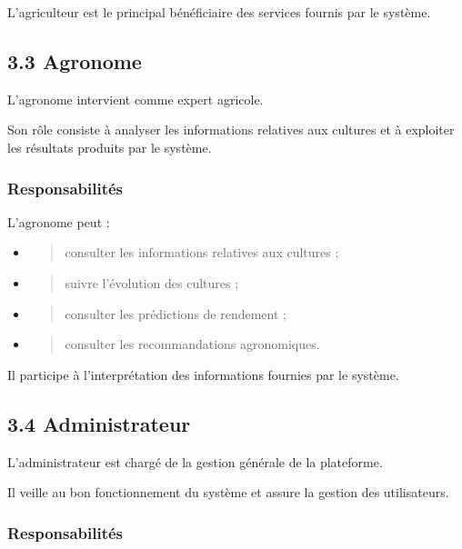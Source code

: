\documentclass[
]{article}
\begin{document}
L'agriculteur est le principal bénéficiaire des services fournis par le
système.

\hypertarget{agronome}{%
\subsection{3.3 Agronome}\label{agronome}}

L'agronome intervient comme expert agricole.

Son rôle consiste à analyser les informations relatives aux cultures et
à exploiter les résultats produits par le système.

\hypertarget{responsabilituxe9s-1}{%
\subsubsection{Responsabilités}\label{responsabilituxe9s-1}}

L'agronome peut :

\begin{itemize}
\item
  \begin{quote}
  consulter les informations relatives aux cultures ;
  \end{quote}
\item
  \begin{quote}
  suivre l'évolution des cultures ;
  \end{quote}
\item
  \begin{quote}
  consulter les prédictions de rendement ;
  \end{quote}
\item
  \begin{quote}
  consulter les recommandations agronomiques.
  \end{quote}
\end{itemize}

Il participe à l'interprétation des informations fournies par le
système.

\hypertarget{administrateur}{%
\subsection{3.4 Administrateur}\label{administrateur}}

L'administrateur est chargé de la gestion générale de la plateforme.

Il veille au bon fonctionnement du système et assure la gestion des
utilisateurs.

\hypertarget{responsabilituxe9s-2}{%
\subsubsection{Responsabilités}\label{responsabilituxe9s-2}}
\end{document}
